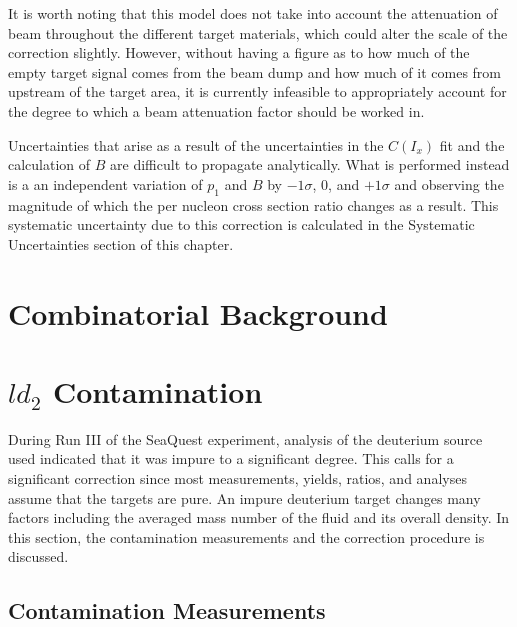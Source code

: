 It is worth noting that this model does not take into account the attenuation of beam throughout the different target materials, which could alter the scale of the correction slightly. However, without having a figure as to how much of the empty target signal comes from the beam dump and how much of it comes from upstream of the target area, it is currently infeasible to appropriately account for the degree to which a beam attenuation factor should be worked in.

Uncertainties that arise as a result of the uncertainties in the $C(I_x)$ fit and the calculation of $B$ are difficult to propagate analytically. What is performed instead is a an independent variation of $p_1$ and $B$ by $-1\sigma$, 0, and $+1\sigma$ and observing the magnitude of which the per nucleon cross section ratio changes as a result. This systematic uncertainty due to this correction is calculated in the Systematic Uncertainties section of this chapter.

\section{Combinatorial Background}


\section{$ld_2$ Contamination}

During Run III of the SeaQuest experiment, analysis of the deuterium source used indicated that it was impure to a significant degree. This calls for a significant correction since most measurements, yields, ratios, and analyses assume that the targets are pure. An impure deuterium target changes many factors including the averaged mass number of the fluid and its overall density. In this section, the contamination measurements and the correction procedure is discussed.

\subsection{Contamination Measurements}


